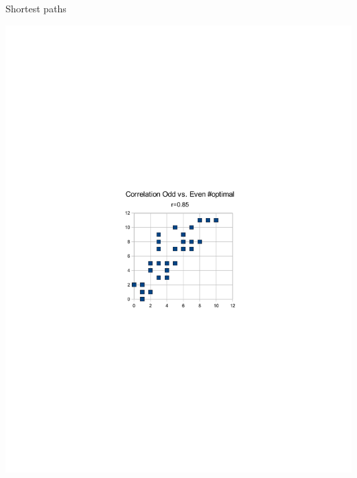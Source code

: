 \documentclass[xcolor=table]{beamer}
\begin{document}
\begin{frame}{Shortest paths}
\centerline{
 \includegraphics[trim= 10cm 10cm 10cm 10cm,height=.9\textheight]{numbershortest.pdf}}
\end{frame}
\end{document}
